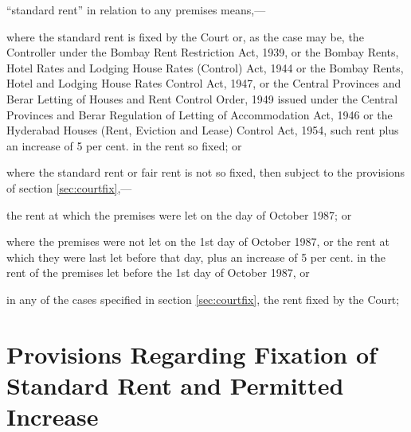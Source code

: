 \documentclass{mhact}
\begin{document}
\begin{subsectionlist}
  
\item ``standard rent'' in relation to any premises
  means,---\label{it:stdrent}
  \begin{clause}
  \item where the standard rent is fixed by the Court or, as the case
    may be, the Controller under the Bombay Rent Restriction Act,
    1939, or the Bombay Rents, Hotel Rates and Lodging House Rates
    (Control) Act, 1944 or the Bombay Rents, Hotel and Lodging House
    Rates Control Act, 1947, or the Central Provinces and Berar
    Letting of Houses and Rent Control Order, 1949 issued under the
    Central Provinces and Berar Regulation of Letting of Accommodation
    Act, 1946 or the Hyderabad Houses (Rent, Eviction and Lease)
    Control Act, 1954, such rent plus an increase of 5 per cent. in
    the rent so fixed; or
  \item where the standard rent or fair rent is not so fixed, then
    subject to the provisions of section \ref{sec:courtfix},--- \label{it:stdrentunfix}
    \begin{subclause}
    \item the rent at which the premises were let on the  day of
      October 1987; or \label{it:oct87}
    \item where the premises were not let on the 1st day of October
      1987, or the rent at which they were last let before that day,
      plus an increase of 5 per cent.  in the rent of the premises let
      before the 1st day of October 1987, or \label{it:oct87no}
    \end{subclause}
  \item in any of the cases specified in section \ref{sec:courtfix},
    the rent fixed by the Court;
\end{clause}
\end{subsectionlist}


\chapter{Provisions Regarding Fixation of Standard Rent and Permitted Increase}
\end{document}
